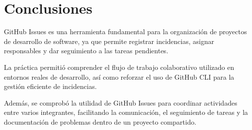 \section{Conclusiones}

GitHub Issues es una herramienta fundamental para la organización de proyectos de desarrollo de software, ya que permite registrar incidencias, asignar responsables y dar seguimiento a las tareas pendientes.

La práctica permitió comprender el flujo de trabajo colaborativo utilizado en entornos reales de desarrollo, así como reforzar el uso de GitHub CLI para la gestión eficiente de incidencias.

Además, se comprobó la utilidad de GitHub Issues para coordinar actividades entre varios integrantes, facilitando la comunicación, el seguimiento de tareas y la documentación de problemas dentro de un proyecto compartido.